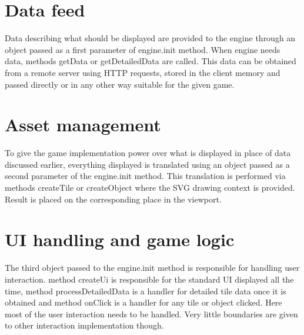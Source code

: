 \documentclass[11pt,oneside, final]{fithesis2}
\begin{document}
\section{Data feed}
Data describing what should be displayed are provided to the engine through an object passed as a first parameter of engine.init method. When engine needs data, methods getData or getDetailedData are called. This data can be obtained from a remote server using HTTP requests, stored in the client memory and passed directly or in any other way suitable for the given game.

\section{Asset management}
To give the game implementation power over what is displayed in place of data discussed earlier, everything displayed is translated using an object passed as a second parameter of the engine.init method. This translation is performed via methods createTile or createObject where the SVG drawing context is provided. Result is placed on the corresponding place in the viewport.

\section{UI handling and game logic}
The third object passed to the engine.init method is responsible for handling user interaction. method createUi is responsible for the standard UI displayed all the time, method processDetailedData is a handler for detailed tile data once it is obtained and method onClick is a handler for any tile or object clicked. Here most of the user interaction needs to be handled. Very little boundaries are given to other interaction implementation though.
\end{document}
